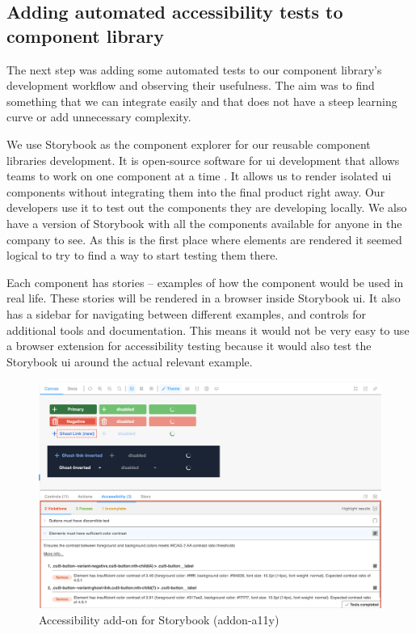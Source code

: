 \documentclass{master_thesis}
\begin{document}
\subsection{Adding automated accessibility tests to component library}
The next step was adding some automated tests to our component library's development workflow and observing their usefulness. The aim was to find something that we can integrate easily and that does not have a steep learning curve or add unnecessary complexity.

We use Storybook as the component explorer for our reusable component libraries development. It is open-source software for \ac{ui} development that allows teams to work on one component at a time \citep{storybook}. It allows us to render isolated \ac{ui} components without integrating them into the final product right away. Our developers use it to test out the components they are developing locally. We also have a version of Storybook with all the components available for anyone in the company to see. As this is the first place where elements are rendered it seemed logical to try to find a way to start testing them there.

Each component has stories – examples of how the component would be used in real life. These stories will be rendered in a browser inside Storybook \ac{ui}. It also has a sidebar for navigating between different examples, and controls for additional tools and documentation. This means it would not be very easy to use a browser extension for accessibility testing because it would also test the Storybook \ac{ui} around the actual relevant example.

\begin{figure}[H]
	\includegraphics[width=\textwidth]{img/addon-a11y.png}
	\caption{Accessibility add-on for Storybook (addon-a11y)}
	\label{fig:addon-a11y}
\end{figure}
\end{document}
